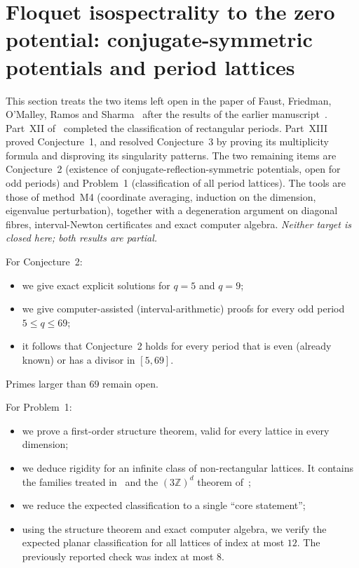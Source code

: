 \documentclass[11pt]{amsart}
\theoremstyle{definition}
\theoremstyle{remark}
\providecommand{\C}{\mathbb C}
\providecommand{\R}{\mathbb R}
\providecommand{\Q}{\mathbb Q}
\providecommand{\Z}{\mathbb Z}
\begin{document}
\providecommand{\Z}{\mathbb{Z}}
\providecommand{\C}{\mathbb{C}}
\providecommand{\R}{\mathbb{R}}
\providecommand{\Q}{\mathbb{Q}}
\providecommand{\T}{\mathbb{T}}
\providecommand{\Hdiag}[1]{H_{D}^{#1}}
\providecommand{\Hcirc}{H^{\circ}}
\providecommand{\supp}{\operatorname{supp}}
\providecommand{\diag}{\operatorname{diag}}

\section{Floquet isospectrality to the zero potential: conjugate-symmetric potentials and period lattices}
\label{R3:sec}

This section treats the two items left open in the paper of Faust, Friedman,
O'Malley, Ramos and Sharma~\cite{R3-FFORS} after the results of the earlier
manuscript~\cite{K-034}. Part~XII of~\cite{K-034} completed the classification of
rectangular periods. Part~XIII proved Conjecture~1, and resolved Conjecture~3 by
proving its multiplicity formula and disproving its singularity patterns. The two
remaining items are Conjecture~2 (existence of conjugate-reflection-symmetric
potentials, open for odd periods) and Problem~1 (classification of all period
lattices). The tools are those of method~M4 (coordinate averaging, induction on
the dimension, eigenvalue perturbation), together with a degeneration argument on
diagonal fibres, interval-Newton certificates and exact computer algebra.
\emph{Neither target is closed here; both results are partial.}

For Conjecture~2:
\begin{itemize}
\item we give exact explicit solutions for $q=5$ and $q=9$;
\item we give computer-assisted (interval-arithmetic) proofs for every odd period
$5\le q\le69$;
\item it follows that Conjecture~2 holds for every period that is even (already
known) or has a divisor in $[5,69]$.
\end{itemize}
Primes larger than $69$ remain open.

For Problem~1:
\begin{itemize}
\item we prove a first-order structure theorem, valid for every lattice in every
dimension;
\item we deduce rigidity for an infinite class of non-rectangular lattices. It
contains the families treated in~\cite{R3-FFORS} and the $(3\Z)^d$ theorem
of~\cite{K-034};
\item we reduce the expected classification to a single ``core statement'';
\item using the structure theorem and exact computer algebra, we verify the
expected planar classification for all lattices of index at most $12$.
The previously reported check was index at most $8$.
\end{itemize}
\end{document}
